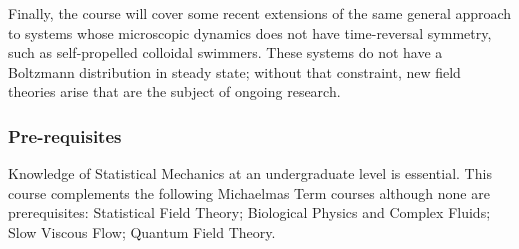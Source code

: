 \documentclass[a4paper]{article}
\begin{document}
{Finally, the course will cover some recent extensions of the same general approach to systems whose microscopic dynamics does not have time-reversal symmetry, such as self-propelled colloidal swimmers. These systems do not have a Boltzmann distribution in steady state; without that constraint, new field theories arise that are the subject of ongoing research.
\subsubsection*{Pre-requisites}
Knowledge of Statistical Mechanics at an undergraduate level is essential. This course complements the following Michaelmas Term courses although none are prerequisites: Statistical Field Theory; Biological Physics and Complex Fluids; Slow Viscous Flow; Quantum Field Theory.
}
\tableofcontents

\printindex
\end{document}
